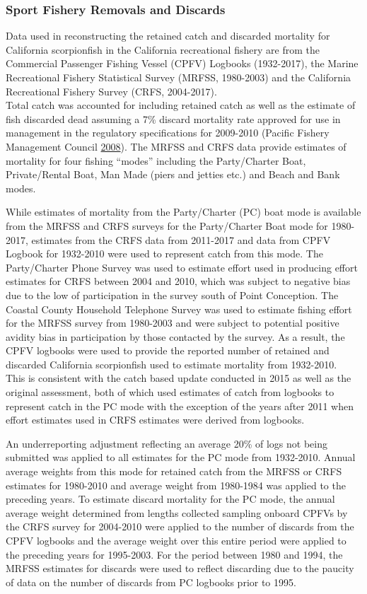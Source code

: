 \documentclass[12pt,]{article}
\begin{document}
\subsubsection{Sport Fishery Removals and
Discards}\label{sport-fishery-removals-and-discards}

Data used in reconstructing the retained catch and discarded mortality
for California scorpionfish in the California recreational fishery are
from the Commercial Passenger Fishing Vessel (CPFV) Logbooks
(1932-2017), the Marine Recreational Fishery Statistical Survey (MRFSS,
1980-2003) and the California Recreational Fishery Survey (CRFS,
2004-2017).\\
Total catch was accounted for including retained catch as well as the
estimate of fish discarded dead assuming a 7\% discard mortality rate
approved for use in management in the regulatory specifications for
2009-2010 (Pacific Fishery Management Council
\protect\hyperlink{ref-PFMC2008}{2008}). The MRFSS and CRFS data provide
estimates of mortality for four fishing ``modes'' including the
Party/Charter Boat, Private/Rental Boat, Man Made (piers and jetties
etc.) and Beach and Bank modes.

While estimates of mortality from the Party/Charter (PC) boat mode is
available from the MRFSS and CRFS surveys for the Party/Charter Boat
mode for 1980-2017, estimates from the CRFS data from 2011-2017 and data
from CPFV Logbook for 1932-2010 were used to represent catch from this
mode. The Party/Charter Phone Survey was used to estimate effort used in
producing effort estimates for CRFS between 2004 and 2010, which was
subject to negative bias due to the low of participation in the survey
south of Point Conception. The Coastal County Household Telephone Survey
was used to estimate fishing effort for the MRFSS survey from 1980-2003
and were subject to potential positive avidity bias in participation by
those contacted by the survey. As a result, the CPFV logbooks were used
to provide the reported number of retained and discarded California
scorpionfish used to estimate mortality from 1932-2010.\\
This is consistent with the catch based update conducted in 2015 as well
as the original assessment, both of which used estimates of catch from
logbooks to represent catch in the PC mode with the exception of the
years after 2011 when effort estimates used in CRFS estimates were
derived from logbooks.

An underreporting adjustment reflecting an average 20\% of logs not
being submitted was applied to all estimates for the PC mode from
1932-2010. Annual average weights from this mode for retained catch from
the MRFSS or CRFS estimates for 1980-2010 and average weight from
1980-1984 was applied to the preceding years. To estimate discard
mortality for the PC mode, the annual average weight determined from
lengths collected sampling onboard CPFVs by the CRFS survey for
2004-2010 were applied to the number of discards from the CPFV logbooks
and the average weight over this entire period were applied to the
preceding years for 1995-2003. For the period between 1980 and 1994, the
MRFSS estimates for discards were used to reflect discarding due to the
paucity of data on the number of discards from PC logbooks prior to
1995.
\end{document}
